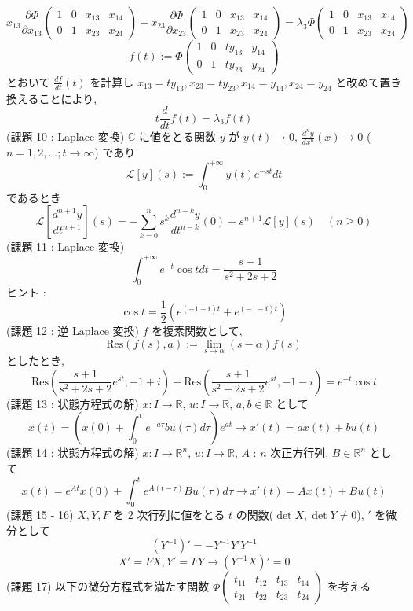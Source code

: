\documentclass{article}
\begin{document}
\[ x_{13} \frac{\partial \Phi}{\partial x_{13}} \begin{pmatrix}
  1 & 0 & x_{13} & x_{14} \\
  0 & 1 & x_{23} & x_{24}
\end{pmatrix} + x_{23} \frac{\partial \Phi}{\partial x_{23}} \begin{pmatrix}
  1 & 0 & x_{13} & x_{14} \\
  0 & 1 & x_{23} & x_{24}
\end{pmatrix}= \lambda_3 \Phi \begin{pmatrix}
  1 & 0 & x_{13} & x_{14} \\
  0 & 1 & x_{23} & x_{24}
\end{pmatrix}\]
\[ f(t) := \Phi
\begin{pmatrix}
  1 & 0 & t y_{13} & y_{14} \\
  0 & 1 & t y_{23} & y_{24}
\end{pmatrix} \]
とおいて $\frac{df}{dt}(t)$ を計算し $x_{13} = t y_{13}, x_{23} = t y_{23}, x_{14} = y_{14}, x_{24} = y_{24}$ と改めて置き換えることにより, 
\[ t \frac{d}{dt} f(t) = \lambda_3 f(t) \]
(課題 10 : Laplace 変換) $\mathbb{C}$ に値をとる関数 $y$ が $y(t) \to 0$, $\frac{d^n y}{dx^n} (x) \to 0$ ($n = 1,2, ...; t \to \infty$) であり
\[ \mathcal{L}[y](s) := \int^{+\infty}_{0} y(t) e^{-st} dt \]
であるとき
\[ \mathcal{L}[\frac{d^{n+1}y}{dt^{n+1}}](s) = - \sum^{n}_{k=0} s^{k} \frac{d^{n-k}y}{dt^{n-k}}(0) + s^{n+1} \mathcal{L}[y](s) \quad (n \geq 0) \]
(課題 11 : Laplace 変換) 
\[ \int^{+\infty}_{0} e^{-t}\cos{t} dt = \frac{s+1}{s^2+2s+2} \]
ヒント :
\[ \cos{t} = \frac{1}{2} (e^{(-1+i)t} + e^{(-1-i)t}) \]
(課題 12 : 逆 Laplace 変換) $f$ を複素関数として,
\[\text{Res} (f(s), a) := \lim_{s \to \alpha} (s-\alpha)f(s)\]
としたとき,
\[ \text{Res} \left( \frac{s+1}{s^2+2s+2}e^{st}, -1+i \right) + \text{Res} \left( \frac{s+1}{s^2+2s+2}e^{st}, -1-i \right) = e^{-t}\cos{t} \]
\newpage \noindent
(課題 13 : 状態方程式の解) $x : I \to \mathbb{R}$, $u : I \to \mathbb{R}$, $a, b \in \mathbb{R}$ として
\[ x(t) = \left( x(0) + \int^{t}_{0} e^{-a \tau} bu(\tau)d\tau \right) e^{at} \rightarrow x'(t) = ax(t) + bu(t) \]
(課題 14 : 状態方程式の解) $x : I \to \mathbb{R}^n$, $u : I \to \mathbb{R}$, $A$ : $n$ 次正方行列, $B \in \mathbb{R}^n$ として
\[ x(t) = e^{At} x(0) + \int^{t}_{0} e^{A(t-\tau)} Bu(\tau)d\tau \rightarrow x'(t) = Ax(t) + Bu(t) \]
(課題 15 - 16) $X, Y, F$ を 2 次行列に値をとる $t$ の関数($\det X, \det Y \ne 0$), $'$ を微分として
\[ (Y^{-1})'= -Y^{-1}Y'Y^{-1} \]
\[ X'=FX, Y'=FY \to (Y^{-1}X)' = 0\] 
(課題 17) 以下の微分方程式を満たす関数 $\Phi\begin{pmatrix}
t_{11} & t_{12} & t_{13} & t_{14} \\
t_{21} & t_{22} & t_{23} & t_{24}
\end{pmatrix}$ を考える
\end{document}
